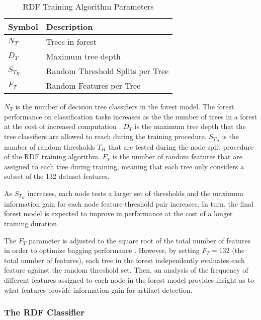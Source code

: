 \def\NT{N_T}
\def\DT{D_T}
\def\TH{T_H}
\def\STH{S_{\TH}}
\def\FT{F_T}

\begin{table}[htbp]
  \caption{RDF Training Algorithm Parameters}
  \label{tab:rdf-parameters}
  \centering
  \begin{tabular}{ll}
  \hline
  \textbf{Symbol} & \textbf{Description} \\
  \hline
  $\NT$ & Trees in forest \\
  $\DT$ & Maximum tree depth \\
  $\STH$ & Random Threshold Splits per Tree \\
  $\FT$ & Random Features per Tree \\
  \hline
  \end{tabular}
\end{table}

$\NT$ is the number of decision tree classifiers in the forest model. The forest performance on classification tasks increases as the the number of trees in a forest at the cost of increased computation \cite{Breiman2001}. $\DT$ is the maximum tree depth that the tree classifiers are allowed to reach during the training procedure. $\STH$ is the number of random thresholds $\TH$ that are tested during the node split procedure of the RDF training algorithm. $\FT$ is the number of random features that are assigned to each tree during training, meaning that each tree only considers a subset of the 132 dataset features.

As $\STH$ increases, each node tests a larger set of thresholds and the maximum information gain for each node feature-threshold pair increases. In turn, the final forest model is expected to improve in performance at the cost of a longer training duration.

The $\FT$ parameter is adjusted to the square root of the total number of features in order to optimize bagging performance \cite{Breiman2001}. However, by setting $\FT=132$ (the total number of features), each tree in the forest independently evaluates each feature against the random threshold set. Then, an analysis of the frequency of different features assigned to each node in the forest model provides insight as to what features provide information gain for artifact detection.

\subsubsection{The RDF Classifier}
\label{sec:sol_maskgen}

